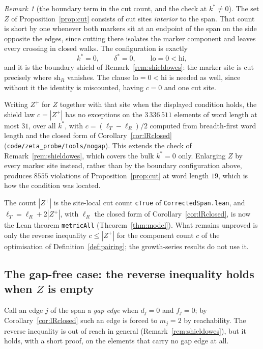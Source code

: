 \documentclass[11pt]{article}
\theoremstyle{plain}
\theoremstyle{definition}
\theoremstyle{remark}
\newtheorem{remark}[theorem]{Remark}
\begin{document}
\begin{remark}[the boundary term in the cut count, and the check at $k^\ast\ne0$]\label{rem:boundaryterm}
The set $Z$ of Proposition~\ref{prop:cut} consists of cut sites \emph{interior} to the span. That
count is short by one whenever both markers sit at an endpoint of the span on the side opposite the
edges, since cutting there isolates the marker component and leaves every crossing in closed walks.
The configuration is exactly
\[
   k^\ast=0,\qquad \delta^\ast=0,\qquad \mathrm{lo}=0<\mathrm{hi},
\]
and it is the boundary shield of Remark~\ref{rem:shieldowes}: the marker site is cut precisely where
$\mathrm{sh}_R$ vanishes. The clause $\mathrm{lo}=0<\mathrm{hi}$ is needed as well, since without it
the identity is miscounted, having $c=0$ and one cut site.

Writing $Z^{+}$ for $Z$ together with that site when the displayed condition holds, the shield law
$c=|Z^{+}|$ has no exceptions on the $3\,336\,511$ elements of word length at most $31$, over all
$k^\ast$, with $c=(\ell_T-\ell_R)/2$ computed from breadth-first word length and the closed form of
Corollary~\ref{cor:lRclosed} (\texttt{code/zeta\_probe/tools/nogap}). This extends the check of
Remark~\ref{rem:shieldowes}, which covers the bulk $k^\ast=0$ only. Enlarging $Z$ by every marker
site instead, rather than by the boundary configuration above, produces $8555$ violations of
Proposition~\ref{prop:cut} at word length $19$, which is how the condition was located.

The count $|Z^{+}|$ is the site-local cut count \texttt{cTrue} of \texttt{CorrectedSpan.lean}, and
$\ell_T=\ell_R+2|Z^{+}|$, with $\ell_R$ the closed form of Corollary~\ref{cor:lRclosed}, is now the
Lean theorem \texttt{metricAll} (Theorem~\ref{thm:model}). What remains unproved is only the
reverse inequality $c\le|Z^{+}|$ for the component count $c$ of the optimisation of
Definition~\ref{def:pairing}; the growth-series results do not use it.
\end{remark}

\subsection{The gap-free case: the reverse inequality holds when $Z$ is empty}\label{ss:nogap}

Call an edge $j$ of the span a \emph{gap edge} when $d_j=0$ and $f_j=0$; by
Corollary~\ref{cor:lRclosed} such an edge is forced to $m_j=2$ by reachability. The reverse
inequality is out of reach in general (Remark~\ref{rem:shieldowes}), but it holds, with a short
proof, on the elements that carry no gap edge at all.
\end{document}
